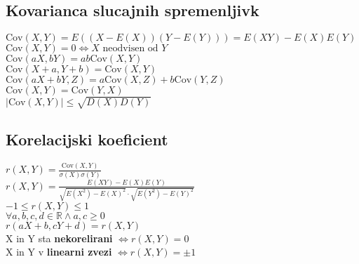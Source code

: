 \subsection{Kovarianca slucajnih spremenljivk}
$\text{Cov}(X,Y)=E((X-E(X))(Y-E(Y)))=E(XY)-E(X)E(Y)$\\
$\text{Cov}(X,Y)=0\Leftrightarrow X\text{ neodvisen od }Y$\\
$\text{Cov}(aX,bY)=ab\text{Cov}(X,Y)$\\
$\text{Cov}(X+a,Y+b)=\text{Cov}(X,Y)$\\
$\text{Cov}(aX+bY,Z)=a\text{Cov}(X,Z)+b\text{Cov}(Y,Z)$\\
$\text{Cov}(X,Y)=\text{Cov}(Y,X)$\\
$|\text{Cov}(X,Y)|\leq\sqrt{D(X)D(Y)}$\\

\subsection{Korelacijski koeficient}
$r(X,Y)=\frac{\text{Cov}(X,Y)}{\sigma(X)\sigma(Y)}$\\
$r(X,Y)=\frac{E(XY)-E(X)E(Y)}{\sqrt{E(X^2)-E(X)^2}\cdot\sqrt{E(Y^2)-E(Y)^2}}$\\
$-1\leq r(X,Y)\leq 1$\\
$\forall a,b,c,d \in \mathbb{R} \land  a,c\ge 0$\\
$r(aX+b,cY+d)=r(X,Y)$\\
X in Y sta \textbf{nekorelirani} $\Leftrightarrow r(X,Y)=0$\\
X in Y v \textbf{linearni zvezi} $\Leftrightarrow r(X,Y)=\pm 1$\\